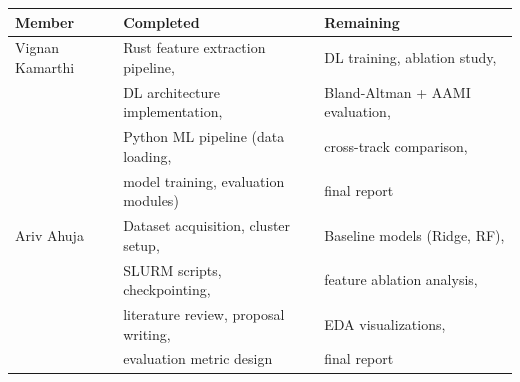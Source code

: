 \documentclass[11pt]{article}
\begin{document}
\vspace{0.5em}
\noindent
\begin{tabular}{@{}lll@{}}
\toprule
\textbf{Member} & \textbf{Completed} & \textbf{Remaining} \\
\midrule
Vignan Kamarthi & Rust feature extraction pipeline, & DL training, ablation study, \\
 & DL architecture implementation, & Bland-Altman + AAMI evaluation, \\
 & Python ML pipeline (data loading, & cross-track comparison, \\
 & model training, evaluation modules) & final report \\
\midrule
Ariv Ahuja & Dataset acquisition, cluster setup, & Baseline models (Ridge, RF), \\
 & SLURM scripts, checkpointing, & feature ablation analysis, \\
 & literature review, proposal writing, & EDA visualizations, \\
 & evaluation metric design & final report \\
\bottomrule
\end{tabular}

\clearpage


\end{document}

